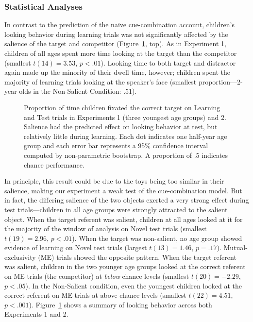 \documentclass[man,floatsintext]{apa6}
\begin{document}
\subsubsection{Statistical Analyses}

In contrast to the prediction of the na\"{i}ve cue-combination account, children's looking behavior during learning trials was not significantly affected by the salience of the target and competitor (Figure~\ref{fig:exp1_2}, top). As in Experiment 1, children of all ages spent more time looking at the target than the competitor (smallest $t(14)  = 3.53$, $p < .01$). Looking time to both target and distractor again made up the minority of their dwell time, however; children spent the majority of learning trials looking at the speaker's face (smallest proportion---2-year-olds in the Non-Salient Condition: .51).


\begin{figure}[t]
	\caption{\label{fig:exp1_2} Proportion of time children fixated the correct target on Learning and Test trials in Experiments 1 (three youngest age groups) and 2. Salience had the predicted effect on looking behavior at test, but relatively little during learning. Each dot indicates one half-year age group and each error bar represents a 95\% confidence interval computed by non-parametric bootstrap. A proportion of .5 indicates chance performance.}
\end{figure}

In principle, this result could be due to the toys being too similar in their salience, making our experiment a weak test of the cue-combination model. But in fact, the differing salience of the two objects exerted a very strong effect during test trials---children in all age groups were strongly attracted to the salient object. When the target referent was salient, children at all ages looked at it for the majority of the window of analysis on Novel test trials (smallest $t(19)  = 2.96$, $p < .01$). When the target was non-salient, no age group showed evidence of learning on Novel test trials (largest $t(13)  = 1.46$, $p = .17$). Mutual-exclusivity (ME) trials showed the opposite pattern. When the target referent was salient, children in the two younger age groups looked at the correct referent on ME trials (the competitor) at \emph{below} chance levels (smallest $t(20) = -2.29$, $p < .05$). In the Non-Salient condition, even the youngest children looked at the correct referent on ME trials at above chance levels (smallest $t(22) = 4.51$, $p < .001$). Figure~\ref{fig:exp1_2} shows a summary of looking behavior across both Experiments 1 and 2.
\end{document}
